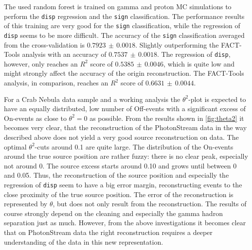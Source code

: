 The used random forest is trained on gamma and proton MC simulations to perform
the \texttt{disp} regression and the \texttt{sign} classification. The
performance results of this training are very good for the \texttt{sign}
classification, while the regression of \texttt{disp} seems to be more
difficult. The accuracy of the \texttt{sign} classification averaged from the
cross-validation is $0.7923\,\pm\,0.0018$. Slightly outperforming the FACT-
Tools analysis with an accuracy of $0.7537\,\pm\,0.0018$. The regression of
\texttt{disp}, however, only reaches an $R^2$ score of $0.5385\,\pm\,0.0046$,
which is quite low and might strongly affect the accuracy of the origin
reconstruction. The FACT-Tools analysis, in comparison, reaches an $R^2$ score
of $0.6631\,\pm\,0.0044$.

For a Crab Nebula data sample and a working analysis the $\theta^2$-plot is
expected to have an equally distributed, low number of Off-events with a
significant excess of On-events as close to $\theta^2 = 0$ as possible. From
the results shown in \autoref{fig:theta2} it becomes very clear, that the
reconstruction of the PhotonStream data in the way described above does not
yield a very good source reconstruction on data. The optimal $\theta^2$-cuts
around \num{0.1} are quite large. The distribution of the On-events around the
true source position are rather fuzzy: there is no clear peak, especially not
around \num{0}. The source excess starts around \num{0.10} and grows until
between \num{0} and \num{0.05}. Thus, the reconstruction of the source position
and especially the regression of \texttt{disp} seem to have a big error margin,
reconstructing events to the close proximity of the true source position. The
error of the reconstruction is represented by $\theta$, but does not only
result from the reconstruction. The results of course strongly depend on the
cleaning and especially the gamma hadron separation just as much. However, from
the above investigations it becomes clear that on PhotonStream data the right
reconstruction requires a deeper understanding of the data in this new
representation.
%

